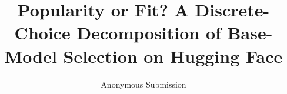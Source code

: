 \documentclass[format=acmsmall, review=false]{acmart}
\title[Popularity or Fit?]{Popularity or Fit? A Discrete-Choice Decomposition of Base-Model Selection on Hugging Face}
\author{Anonymous Submission}
\newcommand{\1}{\mathbf{1}}
\begin{document}
\begin{titlepage}
\maketitle
\vspace{1cm}
\setcounter{tocdepth}{2}
\tableofcontents
\end{titlepage}












\appendix





\end{document}
